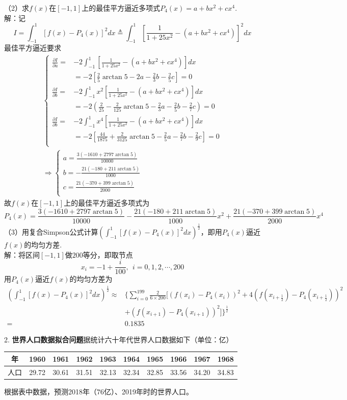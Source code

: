 \documentclass[10pt,a4paper]{article}
\begin{document}
（2）求$f(x)$在$[-1,1]$上的最佳平方逼近多项式$P_4(x)=a+bx^2+cx^4$.\\
解：记
\[
I=\int_{-1}^1[f(x)-P_4(x)]^2dx\triangleq\int_{-1}^1[\frac{1}{1+25x^2}-(a+bx^2+cx^4)]^2dx
\]
最佳平方逼近要求
\begin{gather*}
\left\{\begin{array}{ll}
\frac{\partial I}{\partial a}=&-2\int_{-1}^1[\frac{1}{1+25x^2}-(a+bx^2+cx^4)]dx\\
&=-2[\frac{2}{5}\arctan5-2a-\frac{2}{3}b-\frac{2}{5}c]=0\\
\frac{\partial I}{\partial b}=&-2\int_{-1}^1x^2[\frac{1}{1+25x^2}-(a+bx^2+cx^4)]dx\\
&=-2(\frac{2}{25}-\frac{2}{125}\arctan5-\frac{2}{3}a-\frac{2}{5}b-\frac{2}{7}c)=0\\
\frac{\partial I}{\partial b}=&-2\int_{-1}^1x^4[\frac{1}{1+25x^2}-(a+bx^2+cx^4)]dx\\
&=-2[\frac{44}{1875}+\frac{2}{3125}\arctan5-\frac{2}{5}a-\frac{2}{7}b-\frac{2}{9}c]=0\\
\end{array}\right.\\
\Longrightarrow\left\{\begin{array}{l}
a=\frac{3(-1610+2797\arctan5)}{10000}\\
b=-\frac{21(-180+211\arctan5)}{1000}\\
c=\frac{21(-370+399\arctan5)}{2000}\\
\end{array}\right.
\end{gather*}
故$f(x)$在$[-1,1]$上的最佳平方逼近多项式为
\footnotesize\[
P_4(x)=\frac{3(-1610+2797\arctan5)}{10000}-\frac{21(-180+211\arctan5)}{1000}x^2+\frac{21(-370+399\arctan5)}{2000}x^4
\]\normalsize
（3）用复合Simpson公式计算$(\int_{-1}^1[f(x)-P_4(x)]^2dx)^{\frac{1}{2}}$，即用$P_4(x)$逼近$f(x)$的均匀方差.\\
解：将区间$[-1,1]$做$200$等分，即取节点
\[
x_i=-1+\frac{i}{100},~~i=0,1,2,\cdots,200
\]
用$P_4(x)$逼近$f(x)$的均匀方差为
\small\begin{align*}
(\int_{-1}^1[f(x)-P_4(x)]^2dx)^{\frac{1}{2}}\approx&\{\sum_{i=0}^{199}\frac{2}{6\times200}[(f(x_i)-P_4(x_i))^2+4(f(x_{i+\frac{1}{2}})-P_4(x_{i+\frac{1}{2}}))^2\\
&+(f(x_{i+1})-P_4(x_{i+1}))^2]\}^{\frac{1}{2}}\\
=&0.1835
\end{align*}\normalsize

2. \textbf{世界人口数据拟合问题}据统计六十年代世界人口数据如下（单位：亿）\\
\begin{table}[h]
\begin{tabular}{|c|c|c|c|c|c|c|c|c|c|}
\hline
年  & 1960  & 1961  & 1962  & 1963  & 1964  & 1965  & 1966  & 1967  & 1968  \\ \hline
人口 & 29.72 & 30.61 & 31.51 & 32.13 & 32.34 & 32.85 & 33.56 & 34.20 & 34.83 \\ \hline
\end{tabular}
\end{table}
根据表中数据，预测2018年（$76$亿）、2019年时的世界人口。
\end{document}
